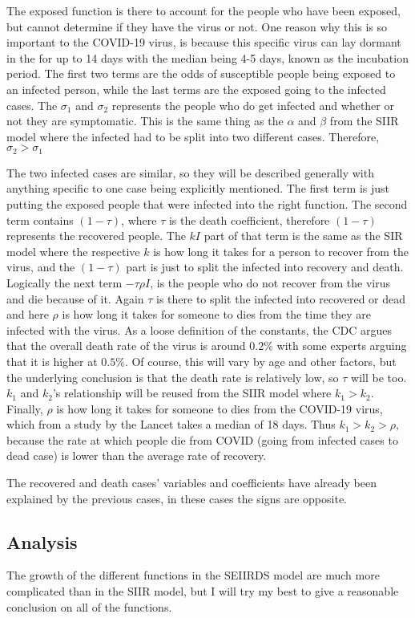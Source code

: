 \documentclass[12pt]{article} %
\begin{document}
The exposed function is there to account for the people who have been exposed, but cannot determine if they have the virus or not. One reason why this is so important to the COVID-19 virus, is because this specific virus can lay dormant in the for up to 14 days with the median being 4-5 days, known as the incubation period. The first two terms are the odds of susceptible people being exposed to an infected person, while the last terms are the exposed going to the infected cases. The $\sigma_1$ and $\sigma_2$ represents the people who do get infected and whether or not they are symptomatic. This is the same thing as the $\alpha$ and $\beta$ from the SIIR model where the infected had to be split into two different cases. Therefore, $\sigma_2 > \sigma_1$

The two infected cases are similar, so they will be described generally with anything specific to one case being explicitly mentioned. The first term is just putting the exposed people that were infected into the right function. The second term contains $(1-\tau)$, where $\tau$ is the death coefficient, therefore $(1-\tau)$ represents the recovered people. The $kI$ part of that term is the same as the SIR model where the respective $k$ is how long it takes for a person to recover from the virus, and the $(1-\tau)$ part is just to split the infected into recovery and death. Logically the next term $-\tau \rho I$, is the people who do not recover from the virus and die because of it. Again $\tau$ is there to split the infected into recovered or dead and here $\rho$ is how long it takes for someone to dies from the time they are infected with the virus. As a loose definition of the constants, the CDC argues that the overall death rate of the virus is around $0.2\%$ with some experts arguing that it is higher at $0.5\%$. Of course, this will vary by age and other factors, but the underlying conclusion is that the death rate is relatively low, so $\tau$ will be too. $k_1$ and $k_2$'s relationship will be reused from the SIIR model where $k_1 > k_2$. Finally, $\rho$ is how long it takes for someone to dies from the COVID-19 virus, which from a study by the Lancet takes a median of 18 days. Thus $k_1 > k_2 > \rho$, because the rate at which people die from COVID (going from infected cases to dead case) is lower than the average rate of recovery. 

The recovered and death cases' variables and coefficients have already been explained by the previous cases, in these cases the signs are opposite.

\subsection{Analysis}
The growth of the different functions in the SEIIRDS model are much more complicated than in the SIIR model, but I will try my best to give a reasonable conclusion on all of the functions. 
\end{document}
